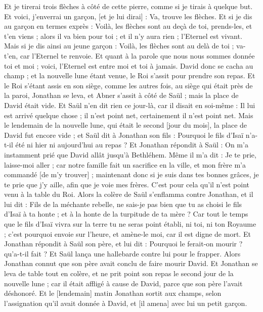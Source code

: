 \begin{multicols}{2}
Et je tirerai trois flèches à côté de cette pierre, comme si je tirais à quelque but.
Et voici, j'enverrai un garçon, [et je lui dirai] : Va, trouve les flèches. Et si je dis au garçon en termes exprès : Voilà, les flèches sont au deçà de toi, prends-les, et t'en viens ; alors il va bien pour toi ; et il n'y aura rien ; l'Eternel est vivant.
Mais si je dis ainsi au jeune garçon : Voilà, les flèches sont au delà de toi ; va-t'en, car l'Eternel te renvoie.
Et quant à la parole que nous nous sommes donnée toi et moi ; voici, l'Eternel est entre moi et toi à jamais.
David donc se cacha au champ ; et la nouvelle lune étant venue, le Roi s'assit pour prendre son repas.
Et le Roi s'étant assis en son siège, comme les autres fois, au siège qui était près de la paroi, Jonathan se leva, et Abner s'assit à côté de Saül ; mais la place de David était vide.
Et Saül n'en dit rien ce jour-là, car il disait en soi-même : Il lui est arrivé quelque chose ; il n'est point net, certainement il n'est point net.
Mais le lendemain de la nouvelle lune, qui était le second [jour du mois], la place de David fut encore vide ; et Saül dit à Jonathan son fils : Pourquoi le fils d'Isaï n'a-t-il été ni hier ni aujourd'hui au repas ?
Et Jonathan répondit à Saül : On m'a instamment prié que David allât jusqu'à Bethléhem.
Même il m'a dit : Je te prie, laisse-moi aller ; car notre famille fait un sacrifice en la ville, et mon frère m'a commandé [de m'y trouver] ; maintenant donc si je suis dans tes bonnes grâces, je te prie que j'y aille, afin que je voie mes frères. C'est pour cela qu'il n'est point venu à la table du Roi.
Alors la colère de Saül s'enflamma contre Jonathan, et il lui dit : Fils de la méchante rebelle, ne sais-je pas bien que tu as choisi le fils d'Isaï à ta honte ; et à la honte de la turpitude de ta mère ?
Car tout le temps que le fils d'Isaï vivra sur la terre tu ne seras point établi, ni toi, ni ton Royaume ; c'est pourquoi envoie sur l'heure, et amène-le moi, car il est digne de mort.
Et Jonathan répondit à Saül son père, et lui dit : Pourquoi le ferait-on mourir ? qu'a-t-il fait ?
Et Saül lança une hallebarde contre lui pour le frapper. Alors Jonathan connut que son père avait conclu de faire mourir David.
Et Jonathan se leva de table tout en colère, et ne prit point son repas le second jour de la nouvelle lune ; car il était affligé à cause de David, parce que son père l'avait déshonoré.
Et le [lendemain] matin Jonathan sortit aux champs, selon l'assignation qu'il avait donnée à David, et [il amena] avec lui un petit garçon.

\end{multicols}
